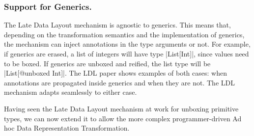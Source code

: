 \subsubsection{Support for Generics.} The Late Data Layout mechanism
is agnostic to generics. This means that, depending on the
transformation semantics and the implementation of generics, the
mechanism can inject annotations in the type arguments or not. For
example, if generics are erased, a list of integers will have type
|List[Int]|, since values need to be boxed. If generics are unboxed
and reified, the list type will be |List[@unboxed Int]|. The LDL
paper \cite{ldl} shows examples of both cases: when
annotations are propagated inside generics and when they are not. The
LDL mechanism adapts seamlessly to either case.

Having seen the Late Data Layout mechanism at work for unboxing primitive types, we can now extend it to allow the more complex programmer-driven Ad hoc Data Representation Transformation.
